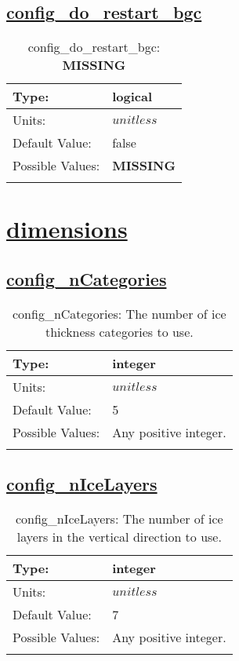 \subsection[config\_do\_restart\_bgc]{\hyperref[sec:nm_tab_restart]{config\_do\_restart\_bgc}}
\label{subsec:nm_sec_config_do_restart_bgc}
\begin{center}
\begin{longtable}{| p{2.0in} || p{4.0in} |}
    \hline
    Type: & logical \\
    \hline
    Units: & $unitless$ \\
    \hline
    Default Value: & false \\
    \hline
    Possible Values: & {\bf \color{red} MISSING} \\
    \hline
    \caption{config\_do\_restart\_bgc: {\bf \color{red} MISSING}}
\end{longtable}
\end{center}
\section[dimensions]{\hyperref[sec:nm_tab_dimensions]{dimensions}}
\label{sec:nm_sec_dimensions}
\subsection[config\_nCategories]{\hyperref[sec:nm_tab_dimensions]{config\_nCategories}}
\label{subsec:nm_sec_config_nCategories}
\begin{center}
\begin{longtable}{| p{2.0in} || p{4.0in} |}
    \hline
    Type: & integer \\
    \hline
    Units: & $unitless$ \\
    \hline
    Default Value: & 5 \\
    \hline
    Possible Values: & Any positive integer. \\
    \hline
    \caption{config\_nCategories: The number of ice thickness categories to use.}
\end{longtable}
\end{center}
\subsection[config\_nIceLayers]{\hyperref[sec:nm_tab_dimensions]{config\_nIceLayers}}
\label{subsec:nm_sec_config_nIceLayers}
\begin{center}
\begin{longtable}{| p{2.0in} || p{4.0in} |}
    \hline
    Type: & integer \\
    \hline
    Units: & $unitless$ \\
    \hline
    Default Value: & 7 \\
    \hline
    Possible Values: & Any positive integer. \\
    \hline
    \caption{config\_nIceLayers: The number of ice layers in the vertical direction to use.}
\end{longtable}
\end{center}
